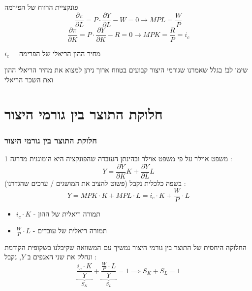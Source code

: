 \documentclass[usenames,dvipsnames]{beamer}
\begin{document}
\begin{RTL}
\begin{frame}[allowframebreaks]
\begin{block}{פונקציית הרווח של הפירמה}
            $$\frac{\partial \pi}{\partial L } = P \cdot \frac{\partial Y}{\partial L} - W = 0 \to MPL = \frac{W}{P}$$
            $$\frac{\partial \pi}{\partial K} = P \cdot \frac{\partial Y}{\partial K} - R = 0 \to MPK = \frac{R}{P} = i_c$$

            $i_c$ = מחיר ההון הריאלי של הפרימה
        \end{block}

        \framebreak

        \begin{alertblock}{שימו לב!}
            בגלל שאמרנו שגורמי היצור קבועים בטווח ארוך ניתן למצוא את מחיר הריאלי ההון ואת השכר הריאלי
        \end{alertblock}
        
    
    \end{frame}

    \section{חלוקת התוצר בין גורמי היצור}
    \begin{frame}[allowframebreaks]
        \frametitle{חלוקת התוצר בין גורמי היצור}
        \begin{block}{משפט אוילר}
            על פי משפט אוילר ובהינתן העובדה שהפונקציה היא הומוגנית מדרגה 1 :
            \begin{equation*}
                Y  = \frac{\partial Y}{\partial K} K + \frac{\partial Y}{\partial L} L
            \end{equation*} 
            בשפה כלכלית נקבל (פשוט להציב את המושגים / ערכים שהגדרנו) : 
            \begin{equation*}
                Y = MPK \cdot  K + MPL \cdot  L = i_c \cdot K + \frac{W}{P} \cdot L
            \end{equation*}
            \begin{itemize}
                \item $i_c \cdot K$ - תמורה ריאלית של ההון
                \item $\frac{W}{P} \cdot L$ - תמורה ריאלית של עובדים
            \end{itemize}
        \end{block}
        

        \framebreak
        \begin{block}{החלוקה היחסית של התוצר בין גורמי היצור}
            נמשיך עם המשוואה שקיבלנו בשקופית הקודמת ונחלק את שני האגפים ב $Y$, נקבל : 
            \begin{equation*}
               \underbrace{ \frac{i_c \cdot K}{Y}}_{S_K} + \underbrace{\frac{\frac{W}{P} \cdot L}{Y}}_{S_L} = 1 \implies S_K + S_L = 1 
            \end{equation*}


\end{block}
\end{frame}
\end{RTL}
\end{document}
